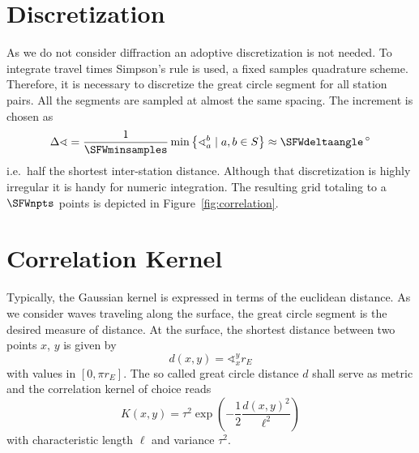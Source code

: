 \documentclass[11pt]{article}
\begin{document}
\section{Discretization}

As we do not consider diffraction an adoptive discretization is not needed.
To integrate travel times Simpson's rule is used, a fixed samples quadrature scheme.
Therefore, it is necessary to discretize the great circle segment for all station pairs.
All the segments are sampled at almost the same spacing.
The increment is chosen as
\begin{equation}
    \Delta\sphericalangle = \frac 1 \SFWminsamples \min\left\{ \sphericalangle_a^b \mid a,b \in S \right\}
    \approx \SFWdeltaangle \,{}^\circ
\end{equation}
i.e.~half the shortest inter-station distance.
Although that discretization is highly irregular it is handy for numeric integration.
The resulting grid totaling to a $\SFWnpts$ points is depicted in Figure~\ref{fig:correlation}.


\section{Correlation Kernel}

Typically, the Gaussian kernel is expressed in terms of the euclidean distance.
As we consider waves traveling along the surface, the great circle segment is the desired measure of distance.
At the surface, the shortest distance between two points $x$, $y$ is given by
\begin{equation}
    d(x,y) = \sphericalangle_x^y r_E
\end{equation}
with values in $[0, \pi r_E]$.
The so called great circle distance $d$ shall serve as metric and the correlation kernel of choice reads
\begin{equation}
    K(x,y) = \tau^2 \exp\!\left(-\frac 12 \frac{d(x,y)^2}{\ell^2}\right)
\end{equation}
with characteristic length $\ell$ and variance $\tau^2$.
\end{document}
